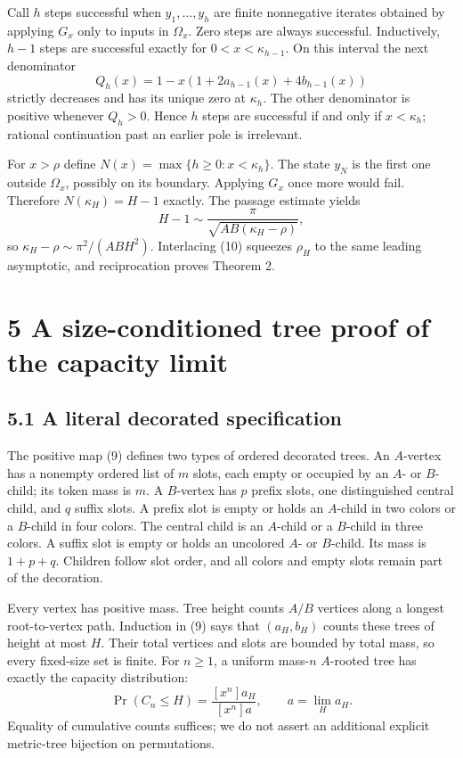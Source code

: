 \documentclass[11pt,letterpaper]{article}
\begin{document}
Call \(h\) steps successful when \(y_1,\ldots,y_h\) are finite
nonnegative iterates obtained by applying \(G_x\) only to inputs in
\(\Omega_x\). Zero steps are always successful. Inductively, \(h-1\)
steps are successful exactly for \(0<x<\kappa_{h-1}\). On this interval
the next denominator \[Q_h(x)=1-x(1+2a_{h-1}(x)+4b_{h-1}(x))\] strictly
decreases and has its unique zero at \(\kappa_h\). The other denominator
is positive whenever \(Q_h>0\). Hence \(h\) steps are successful if and
only if \(x<\kappa_h\); rational continuation past an earlier pole is
irrelevant.

For \(x>\rho\) define \(N(x)=\max\{h\ge0:x<\kappa_h\}\). The state
\(y_N\) is the first one outside \(\Omega_x\), possibly on its boundary.
Applying \(G_x\) once more would fail. Therefore \(N(\kappa_H)=H-1\)
exactly. The passage estimate yields
\[H-1\sim\frac\pi{\sqrt{AB(\kappa_H-\rho)}},\] so
\(\kappa_H-\rho\sim\pi^2/(ABH^2)\). Interlacing (10) squeezes \(\rho_H\)
to the same leading asymptotic, and reciprocation proves Theorem 2.

\section{5 A size-conditioned tree proof of the capacity
limit}\label{a-size-conditioned-tree-proof-of-the-capacity-limit}

\subsection{5.1 A literal decorated
specification}\label{a-literal-decorated-specification}

The positive map (9) defines two types of ordered decorated trees. An
\(A\)-vertex has a nonempty ordered list of \(m\) slots, each empty or
occupied by an \(A\)- or \(B\)-child; its token mass is \(m\). A
\(B\)-vertex has \(p\) prefix slots, one distinguished central child,
and \(q\) suffix slots. A prefix slot is empty or holds an \(A\)-child
in two colors or a \(B\)-child in four colors. The central child is an
\(A\)-child or a \(B\)-child in three colors. A suffix slot is empty or
holds an uncolored \(A\)- or \(B\)-child. Its mass is \(1+p+q\).
Children follow slot order, and all colors and empty slots remain part
of the decoration.

Every vertex has positive mass. Tree height counts \(A/B\) vertices
along a longest root-to-vertex path. Induction in (9) says that
\((a_H,b_H)\) counts these trees of height at most \(H\). Their total
vertices and slots are bounded by total mass, so every fixed-size set is
finite. For \(n\ge1\), a uniform mass-\(n\) \(A\)-rooted tree has
exactly the capacity distribution:
\[\Pr(C_n\le H)=\frac{[x^n]a_H}{[x^n]a},\qquad a=\lim_Ha_H.\] Equality
of cumulative counts suffices; we do not assert an additional explicit
metric-tree bijection on permutations.
\end{document}
